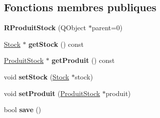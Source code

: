 \subsection*{Fonctions membres publiques}
\begin{DoxyCompactItemize}
\item 
\hypertarget{class_core_1_1_r_produit_stock_ac660f4e216aec2988859d758787aa721}{
{\bfseries RProduitStock} (QObject $\ast$parent=0)}
\label{d1/da9/class_core_1_1_r_produit_stock_ac660f4e216aec2988859d758787aa721}

\item 
\hypertarget{class_core_1_1_r_produit_stock_aff8d6d51552239ba9e58fcf4c64f2453}{
\hyperlink{class_core_1_1_stock}{Stock} $\ast$ {\bfseries getStock} () const }
\label{d1/da9/class_core_1_1_r_produit_stock_aff8d6d51552239ba9e58fcf4c64f2453}

\item 
\hypertarget{class_core_1_1_r_produit_stock_ad7a6991f9312de5682f55999d146e5cb}{
\hyperlink{class_core_1_1_produit_stock}{ProduitStock} $\ast$ {\bfseries getProduit} () const }
\label{d1/da9/class_core_1_1_r_produit_stock_ad7a6991f9312de5682f55999d146e5cb}

\item 
\hypertarget{class_core_1_1_r_produit_stock_ae30f5b0ae401b2982efc10264d26ac57}{
void {\bfseries setStock} (\hyperlink{class_core_1_1_stock}{Stock} $\ast$stock)}
\label{d1/da9/class_core_1_1_r_produit_stock_ae30f5b0ae401b2982efc10264d26ac57}

\item 
\hypertarget{class_core_1_1_r_produit_stock_ac5dfc4e4d36e9181c5a71dfff31d7c5d}{
void {\bfseries setProduit} (\hyperlink{class_core_1_1_produit_stock}{ProduitStock} $\ast$produit)}
\label{d1/da9/class_core_1_1_r_produit_stock_ac5dfc4e4d36e9181c5a71dfff31d7c5d}

\item 
\hypertarget{class_core_1_1_r_produit_stock_af51256847809128d3fcb0a5853d47966}{
bool {\bfseries save} ()}
\label{d1/da9/class_core_1_1_r_produit_stock_af51256847809128d3fcb0a5853d47966}

\end{DoxyCompactItemize}
